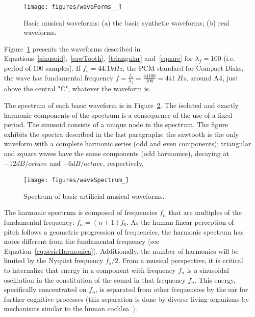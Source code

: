\begin{figure}
    \centering
        \texttt{[image: figures/waveForms\_\_]}
    \caption{Basic musical waveforms: (a) the basic synthetic  waveforms; (b) real waveforms.}
        \label{fig:formasDeOnda}
\end{figure}

Figure~\ref{fig:formasDeOnda} presents the waveforms described in Equations~\ref{sinusoid},~\ref{sawTooth},~\ref{triangular} and~\ref{square} for $\lambda_f=100$ (i.e. period of $100$ samples). If $f_s=44.1kHz$, the PCM standard for Compact Disks, the wave has fundamental frequency $f=\frac{f_a}{\lambda_f}=\frac{44100}{100} = 441 \; Hz$, around A4, just above the central "C", whatever the waveform is.

The spectrum of each basic waveform is in Figure~\ref{fig:espectroDeOndas}. The isolated and exactly harmonic components of the spectrum is a consequence of the use of a fixed period. The sinusoid consists of a unique node in the spectrum. The figure exhibits the spectra described in the last paragraphs: the sawtooth is the only waveform with a complete harmonic series (odd and even components); triangular and square waves have the same components (odd harmonics), decaying at $-12dB/octave$ and $-6dB/octave$, respectively.

\begin{figure}
    \centering
        \texttt{[image: figures/waveSpectrum\_]}
    \caption{Spectrum of basic artificial musical waveforms.}
        \label{fig:espectroDeOndas}
\end{figure}

The harmonic spectrum is composed of frequencies $f_n$ that are multiples of the fundamental frequency: $f_n=(n+1)f_0$. As the human linear perception of pitch follows a geometric progression of frequencies, the harmonic spectrum has notes different from the fundamental frequency (see Equation~\ref{eq:serieHarmonica}). Additionally, the number of harmonics will be limited by the Nyquist frequency $f_s/2$. From a musical perspective, it is critical to internalize that energy in a component with frequency $f_n$ is a sinusoidal oscillation in the constitution of the sound in that frequency $f_n$. This energy, specifically concentrated on $f_n$, is separated from other frequencies by the ear for further cognitive processes (this separation is done by diverse living organisms by mechanisms similar to the human cochlea~\cite{Roederer}).

